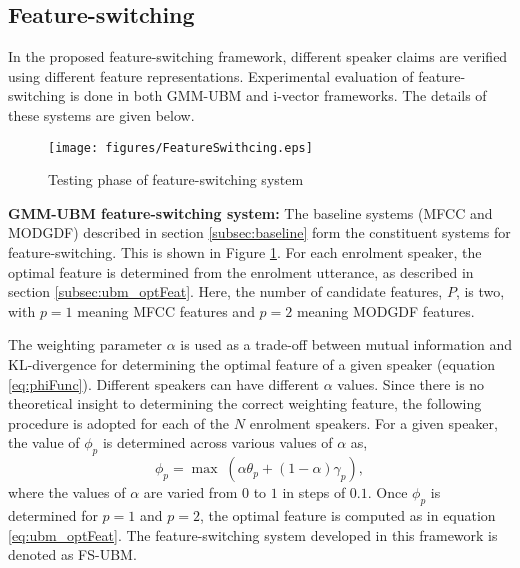 \documentclass{article}
\begin{document}
	
\subsection{Feature-switching}
\label{subsec:featSwitch}

In the proposed feature-switching framework, different speaker
claims are verified using different feature representations. 
Experimental evaluation of feature-switching is done in both
GMM-UBM and i-vector frameworks. The details of these systems
are given below.

\begin{figure}[h]
\texttt{[image: figures/FeatureSwithcing.eps]}
\caption{Testing phase of feature-switching system}
\label{fig:systemArch2}
\end{figure}


\textbf{GMM-UBM feature-switching system:}
The baseline systems (MFCC and MODGDF) described in section
\ref{subsec:baseline} form the constituent systems for feature-switching. This
is shown in Figure \ref{fig:systemArch2}. For each enrolment speaker, the
optimal feature is determined from the enrolment utterance, as described in
section \ref{subsec:ubm_optFeat}. Here, the number of candidate features, $P$,
is two, with $p=1$ meaning MFCC features and $p=2$ meaning MODGDF features.

The weighting parameter $\alpha$ is used as a trade-off between mutual information and
KL-divergence for determining the optimal feature of a given speaker (equation
\ref{eq:phiFunc}). Different speakers can have different $\alpha$ values. Since
there is no theoretical insight to determining the correct weighting feature,
the following procedure is adopted for each of the $N$ enrolment speakers.
For a given speaker, the value of $\phi_p$ is determined across various values
of $\alpha$ as, 
\begin{equation}
\phi_p = \max \; (\alpha \theta_p + (1-\alpha) \gamma_p),
\end{equation}
where the values of $\alpha$ are varied from $0$ to $1$ in steps of $0.1$. Once
$\phi_p$ is determined for $p=1$ and $p=2$, the optimal feature is computed as in equation
\ref{eq:ubm_optFeat}.
The feature-switching system developed in this framework is denoted as
FS-UBM. 
\end{document}

